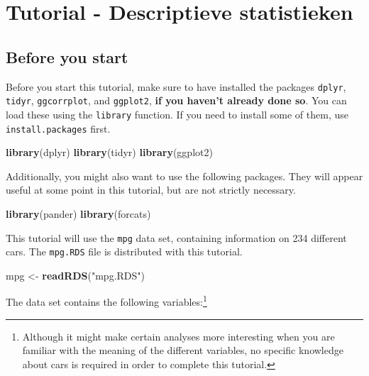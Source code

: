 \documentclass[]{tufte-book}
\newenvironment{Shaded}{}{}
\newcommand{\KeywordTok}[1]{\textcolor[rgb]{0.00,0.44,0.13}{\textbf{#1}}}
\newcommand{\NormalTok}[1]{#1}
\newcommand{\StringTok}[1]{\textcolor[rgb]{0.25,0.44,0.63}{#1}}
\begin{document}
\hypertarget{tutorial---descriptieve-statistieken}{%
\chapter{Tutorial - Descriptieve statistieken}\label{tutorial---descriptieve-statistieken}}

\hypertarget{before-you-start}{%
\section{Before you start}\label{before-you-start}}

Before you start this tutorial, make sure to have installed the packages \texttt{dplyr}, \texttt{tidyr}, \texttt{ggcorrplot}, and \texttt{ggplot2}, \textbf{if you haven't already done so}. You can load these using the \texttt{library} function. If you need to install some of them, use \texttt{install.packages} first.

\begin{Shaded}
\begin{Highlighting}[]
\KeywordTok{library}\NormalTok{(dplyr)}
\KeywordTok{library}\NormalTok{(tidyr)}
\KeywordTok{library}\NormalTok{(ggplot2)}
\end{Highlighting}
\end{Shaded}

Additionally, you might also want to use the following packages. They will appear useful at some point in this tutorial, but are not strictly necessary.

\begin{Shaded}
\begin{Highlighting}[]
\KeywordTok{library}\NormalTok{(pander)}
\KeywordTok{library}\NormalTok{(forcats)}
\end{Highlighting}
\end{Shaded}

This tutorial will use the \texttt{mpg} data set, containing information on 234 different cars. The \texttt{mpg.RDS} file is distributed with this tutorial.

\begin{Shaded}
\begin{Highlighting}[]
\NormalTok{mpg <-}\StringTok{ }\KeywordTok{readRDS}\NormalTok{(}\StringTok{"mpg.RDS"}\NormalTok{)}
\end{Highlighting}
\end{Shaded}

The data set contains the following variables:\footnote{Although it might make certain analyses more interesting when you are familiar with the meaning of the different variables, no specific knowledge about cars is required in order to complete this tutorial.}
\end{document}
